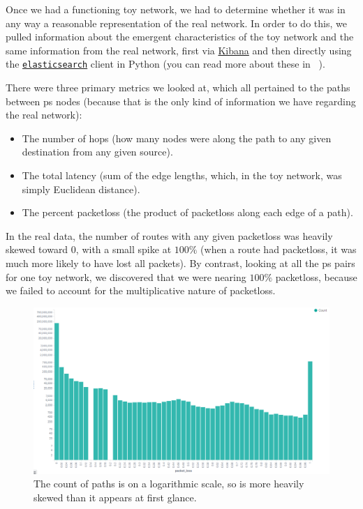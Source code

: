 \documentclass{finalreport}
\begin{document}
Once we had a functioning toy network, we had to determine whether it was in any way a reasonable representation of the real network. In order to do this, we pulled information about the emergent characteristics of the toy network and the same information from the real network, first via \hyperref[kibana]{Kibana} and then directly using the \texttt{\hyperref[es]{elasticsearch}} client in Python (you can read more about these in ~).

There were three primary metrics we looked at, which all pertained to the paths between \gls{ps} nodes (because that is the only kind of information we have regarding the real network):

\begin{itemize}
    \item The number of \glspl{hop} (how many nodes were along the path to any given destination from any given source).
    \item The total \gls{latency} (sum of the edge lengths, which, in the toy network, was simply Euclidean distance).
    \item The percent \gls{packetloss} (the product of \gls{packetloss} along each edge of a path).
\end{itemize}

In the real data, the number of routes with any given \gls{packetloss} was heavily skewed toward $0$, with a small spike at $100\%$ (when a route had \gls{packetloss}, it was much more likely to have lost all packets). By contrast, looking at all the \gls{ps} pairs for one toy network, we discovered that we were nearing $100\%$ \gls{packetloss}, because we failed to account for the multiplicative nature of \gls{packetloss}.

\begin{figure}[!ht]
\centering
\includegraphics[width=.85\linewidth]{week_2/packetloss.png}
\caption{The count of paths is on a logarithmic scale, so is more heavily skewed than it appears at first glance.}
\end{figure}
\end{document}
